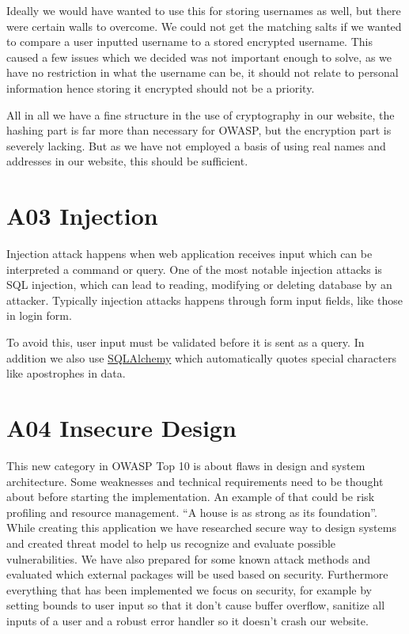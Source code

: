 Ideally we would have wanted to use this for storing usernames as well, but there were certain walls to overcome. We could not get the matching salts if we wanted to compare a user inputted username to a stored encrypted username. This caused a few issues which we decided was not important enough to solve, as we have no restriction in what the username can be, it should not relate to personal information hence storing it encrypted should not be a priority. 

All in all we have a fine structure in the use of cryptography in our website, the hashing part is far more than necessary for OWASP, but the encryption part is severely lacking. But as we have not employed a basis of using real names and addresses in our website, this should be sufficient. 

\section{A03 Injection}

Injection attack happens when web application receives input which can be interpreted a command or query. One of the most notable injection attacks is SQL injection, which can lead to reading, modifying or deleting database by an attacker. Typically injection attacks happens through form input fields, like those in login form.

To avoid this, user input must be validated before it is sent as a query. In addition we also use \href{http://www.rmunn.com/sqlalchemy-tutorial/tutorial.html}{SQLAlchemy} which automatically quotes special characters like apostrophes in data.


\section{A04 Insecure Design}

This new category in OWASP Top 10 is about flaws in design and system architecture. Some weaknesses and technical requirements need to be thought about before starting the implementation. An example of that could be risk profiling and resource management. “A house is as strong as its foundation”. 
While creating this application we have researched secure way to design systems and created threat model to help us recognize and evaluate possible vulnerabilities. We have also prepared for some known attack methods and evaluated which external packages will be used based on security. Furthermore everything that has been implemented we focus on security, for example by setting bounds to user input so that it don’t cause buffer overflow, sanitize all inputs of a user and a robust error handler so it doesn’t crash our website. 

